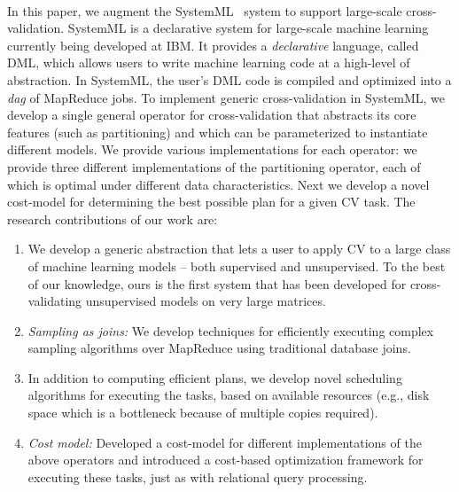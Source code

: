 \documentclass{vldb}
\newcommand{\topic}[1]{\par \smallskip \smallskip \noindent{\bf \uline{#1}}}
\begin{document}
\topic{Our approach}\\
In this paper, we augment the SystemML~\cite{DBLP:conf/icde/TianK11} system to support large-scale
cross-validation. SystemML is a declarative system for large-scale machine
learning currently being developed at IBM. It provides a {\em declarative} language,
called DML, which allows users to write machine learning code at a high-level of
abstraction. In SystemML, the user's DML code is compiled and optimized
into a  {\em dag} of MapReduce jobs. To implement generic cross-validation in SystemML, we develop a single general operator
for cross-validation that abstracts its core features (such as partitioning)
and which can be parameterized to instantiate different models. We provide
various implementations for each operator: we provide three
different implementations of the partitioning operator, each of which is
optimal under different data characteristics. Next we develop a novel cost-model
for determining the best possible plan for a given CV task. The research
contributions of our work are:

\begin{enumerate}
\item  We develop a generic abstraction that lets a user to apply CV to a large
class of machine learning models -- both supervised and unsupervised. To the
best of our knowledge, ours is the first system that has been developed for
cross-validating unsupervised models on very large matrices.

\item {\em Sampling as joins:} We develop techniques for efficiently executing
complex sampling algorithms over MapReduce using traditional database joins.

\item In addition to computing efficient plans, we develop
novel scheduling algorithms for executing the tasks, based on available
resources (e.g., disk space which is a bottleneck because of multiple copies
required).

\item {\em Cost model:} Developed a cost-model for different implementations of
the above operators and introduced a cost-based optimization framework for
executing these tasks, just as with relational query processing.

\end{enumerate}
\end{document}
